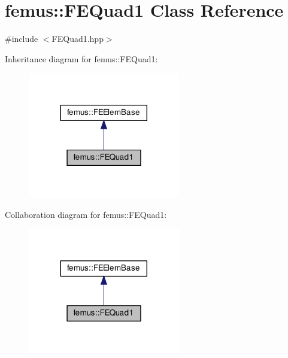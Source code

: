 \hypertarget{classfemus_1_1_f_e_quad1}{}\section{femus\+:\+:F\+E\+Quad1 Class Reference}
\label{classfemus_1_1_f_e_quad1}


{\ttfamily \#include $<$F\+E\+Quad1.\+hpp$>$}



Inheritance diagram for femus\+:\+:F\+E\+Quad1\+:
\nopagebreak
\begin{figure}[H]
\begin{center}
\leavevmode
\includegraphics[width=188pt]{classfemus_1_1_f_e_quad1__inherit__graph}
\end{center}
\end{figure}


Collaboration diagram for femus\+:\+:F\+E\+Quad1\+:
\nopagebreak
\begin{figure}[H]
\begin{center}
\leavevmode
\includegraphics[width=188pt]{classfemus_1_1_f_e_quad1__coll__graph}
\end{center}
\end{figure}
